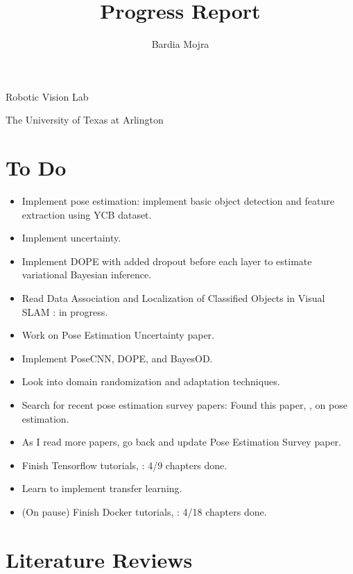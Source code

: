 \documentclass[11pt]{article}
\title{Progress Report}
\author{Bardia Mojra}
\begin{document}
\maketitle
\thispagestyle{empty}

\bigskip
\bigskip
\begin{center}
      Robotic Vision Lab
\end{center}

\begin{center}
      The University of Texas at Arlington
\end{center}

\newpage

\section{To Do}
\begin{itemize}
      \item Implement pose estimation: implement basic object detection and
            feature extraction using YCB dataset.
      \item Implement uncertainty.
      \item Implement DOPE with added dropout before each layer to estimate
            variational Bayesian inference.
      \item Read Data Association and Localization of Classified Objects in Visual
            SLAM \cite{iqbal2020data}: in progress.
      \item Work on Pose Estimation Uncertainty paper.
      \item Implement PoseCNN, DOPE, and BayesOD.
      \item Look into domain randomization and adaptation techniques.
      \item Search for recent pose estimation survey papers: Found this paper,
            \cite{du2020vision}, on pose estimation.
      \item As I read more papers, go back and update Pose Estimation Survey paper.
      \item Finish Tensorflow tutorials, \cite{CVTF2}: 4/9 chapters done.
      \item Learn to implement transfer learning.
      \item (On pause) Finish Docker tutorials, \cite{schenker2020learn}: 4/18
            chapters done.
\end{itemize}

\section{Literature Reviews}
\end{document}
